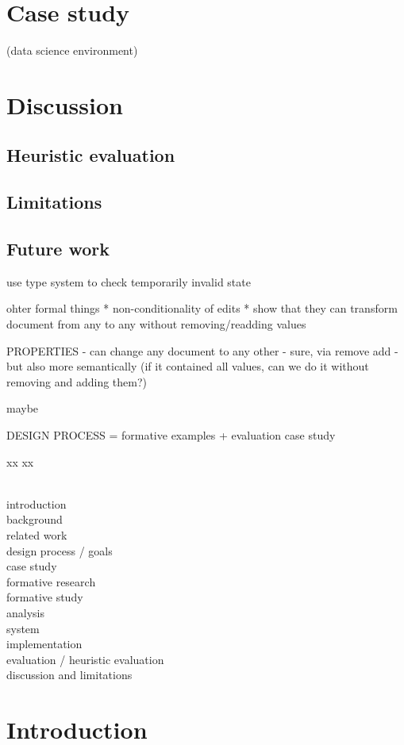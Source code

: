 \documentclass[sigconf]{acmart}
\begin{document}
\section{Case study}
(data science environment)

\section{Discussion}
\subsection{Heuristic evaluation}
\subsection{Limitations}
\subsection{Future work}
\label{sec:discuss-future}
use type system to check temporarily invalid state

ohter formal things
* non-conditionality of edits
* show that they can transform document from any to any without removing/readding values


PROPERTIES
- can change any document to any other - sure, via remove add - but also more semantically
(if it contained all values, can we do it without removing and adding them?)

maybe


DESIGN PROCESS = formative examples + evaluation case study

xx
\newpage
xx

~\\
introduction \\
background \\
related work \\
design process / goals \\
case study \\
formative research \\
formative study \\
analysis \\
system \\
implementation \\
evaluation / heuristic evaluation \\
discussion and limitations \\

\newpage

\section{Introduction}
\end{document}
